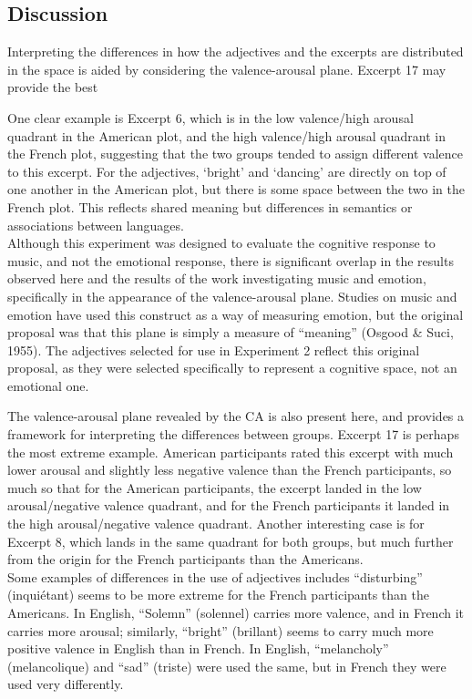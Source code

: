\documentclass[
  english,
  man,floatsintext]{apa6}
\begin{document}
\hypertarget{discussion-1}{%
\subsection{Discussion}\label{discussion-1}}

Interpreting the differences in how the adjectives and the excerpts are distributed in the space is aided by considering the valence-arousal plane. Excerpt 17 may provide the best

One clear example is Excerpt 6, which is in the low valence/high arousal quadrant in the American plot, and the high valence/high arousal quadrant in the French plot, suggesting that the two groups tended to assign different valence to this excerpt. For the adjectives, `bright' and `dancing' are directly on top of one another in the American plot, but there is some space between the two in the French plot. This reflects shared meaning but differences in semantics or associations between languages.\\
Although this experiment was designed to evaluate the cognitive response to music, and not the emotional response, there is significant overlap in the results observed here and the results of the work investigating music and emotion, specifically in the appearance of the valence-arousal plane. Studies on music and emotion have used this construct as a way of measuring emotion, but the original proposal was that this plane is simply a measure of ``meaning'' (Osgood \& Suci, 1955). The adjectives selected for use in Experiment 2 reflect this original proposal, as they were selected specifically to represent a cognitive space, not an emotional one.

The valence-arousal plane revealed by the CA is also present here, and provides a framework for interpreting the differences between groups. Excerpt 17 is perhaps the most extreme example. American participants rated this excerpt with much lower arousal and slightly less negative valence than the French participants, so much so that for the American participants, the excerpt landed in the low arousal/negative valence quadrant, and for the French participants it landed in the high arousal/negative valence quadrant. Another interesting case is for Excerpt 8, which lands in the same quadrant for both groups, but much further from the origin for the French participants than the Americans.\\
Some examples of differences in the use of adjectives includes ``disturbing'' (inquiétant) seems to be more extreme for the French participants than the Americans. In English, ``Solemn'' (solennel) carries more valence, and in French it carries more arousal; similarly, ``bright'' (brillant) seems to carry much more positive valence in English than in French. In English, ``melancholy'' (melancolique) and ``sad'' (triste) were used the same, but in French they were used very differently.
\end{document}
